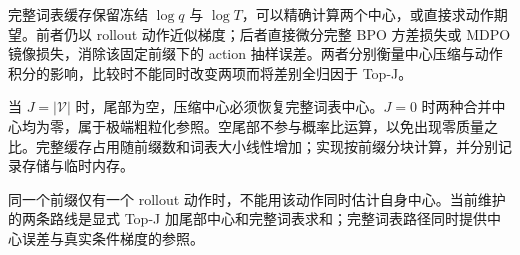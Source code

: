 完整词表缓存保留冻结 $\log q$ 与 $\log T$，可以精确计算两个中心，或直接求动作期望。前者仍以 rollout 动作近似梯度；后者直接微分完整 BPO 方差损失或 MDPO 镜像损失，消除该固定前缀下的 action 抽样误差。两者分别衡量中心压缩与动作积分的影响，比较时不能同时改变两项而将差别全归因于 Top-J。

当 $J=|\mathcal V|$ 时，尾部为空，压缩中心必须恢复完整词表中心。$J=0$ 时两种合并中心均为零，属于极端粗粒化参照。空尾部不参与概率比运算，以免出现零质量之比。完整缓存占用随前缀数和词表大小线性增加；实现按前缀分块计算，并分别记录存储与临时内存。

同一个前缀仅有一个 rollout 动作时，不能用该动作同时估计自身中心。当前维护的两条路线是显式 Top-J 加尾部中心和完整词表求和；完整词表路径同时提供中心误差与真实条件梯度的参照。
